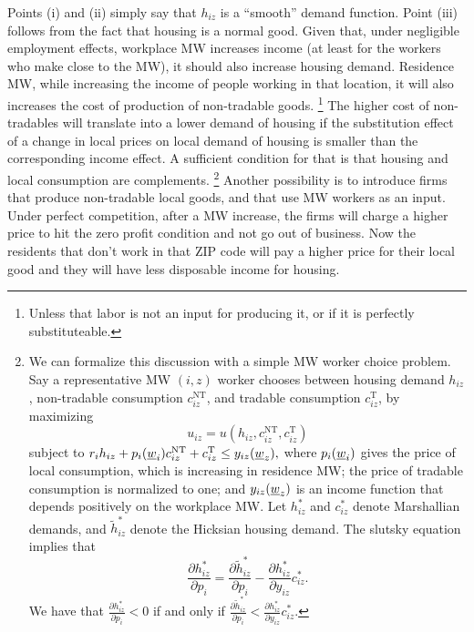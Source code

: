 Points (i) and (ii) simply say that $h_{iz}$ is a ``smooth'' demand function.
Point (iii) follows from the fact that housing is a normal good.
Given that, under negligible employment effects, workplace MW increases income 
(at least for the workers who make close to the MW), it should also increase housing 
demand.
Residence MW, while increasing the income of people working in that location, 
it will also increases the cost of production of non-tradable goods. %
\footnote{Unless that labor is not an input for producing it, or if it is perfectly substituteable.}
The higher cost of non-tradables will translate into a lower demand of housing 
if the substitution effect of a change in local prices on local demand of housing
is smaller than the corresponding income effect. A sufficient condition for that is that 
housing and local consumption are complements.%
\footnote{We can formalize this discussion with a simple MW  worker choice problem.
Say a representative MW $(i,z)$ worker chooses between housing demand $h_{iz}$,
non-tradable consumption $c^{\text{NT}}_{iz}$, and tradable consumption $c^{\text{T}}_{iz}$,
by maximizing
$$u_{iz} = u \left(h_{iz}, c^{\text{NT}}_{iz}, c^{\text{T}}_{iz}\right)$$
subject to 
$r_i h_{iz} + p_i(\underline{w}_i) c^{\text{NT}}_{iz} + c^{\text{T}}_{iz} \leq y_{iz}(\underline{w}_z),$
where $p_i(\underline{w}_i)$ gives the price of local consumption, which is increasing in residence MW;
the price of tradable consumption is normalized to one; and 
$y_{iz}(\underline{w}_z)$ is an income function that depends positively on the workplace MW.
Let $h_{iz}^*$ and $c_{iz}^*$ denote Marshallian demands, and 
$\tilde h_{iz}^*$ denote the Hicksian housing demand.
The slutsky equation implies that
$$\frac{\partial h_{iz}^*}{\partial p_i} 
   = \frac{\partial \tilde h_{iz}^*}{\partial p_i} 
   - \frac{\partial h_{iz}^*}{\partial y_{iz}} c_{iz}^*.$$
We have that $\frac{\partial h_{iz}^*}{\partial p_i} < 0$ if and only if 
$\frac{\partial \tilde h_{iz}^*}{\partial p_i} 
< \frac{\partial h_{iz}^*}{\partial y_{iz}} c_{iz}^*$.} %
Another possibility is to introduce firms that produce non-tradable local goods, and that 
use MW workers as an input. Under perfect competition, after a MW increase, the firms will 
charge a higher price to hit the zero profit condition and not go out of business. Now the 
residents that don't work in that ZIP code will pay a higher price for their local good 
and they will have less disposable income for housing.

